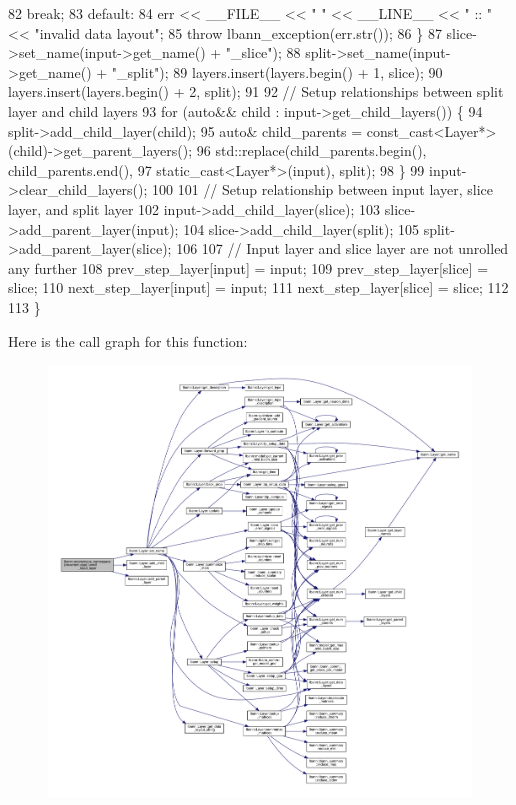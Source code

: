 \begin{DoxyCode}
82     \textcolor{keywordflow}{break};
83   \textcolor{keywordflow}{default}:
84     err << \_\_FILE\_\_ << \textcolor{stringliteral}{" "} << \_\_LINE\_\_ << \textcolor{stringliteral}{" :: "} << \textcolor{stringliteral}{"invalid data layout"};
85     \textcolor{keywordflow}{throw} lbann\_exception(err.str());
86   \}
87   slice->set\_name(input->get\_name() + \textcolor{stringliteral}{"\_slice"});
88   split->set\_name(input->get\_name() + \textcolor{stringliteral}{"\_split"});
89   layers.insert(layers.begin() + 1, slice);
90   layers.insert(layers.begin() + 2, split);
91 
92   \textcolor{comment}{// Setup relationships between split layer and child layers}
93   \textcolor{keywordflow}{for} (\textcolor{keyword}{auto}&& child : input->get\_child\_layers()) \{
94     split->add\_child\_layer(child);
95     \textcolor{keyword}{auto}& child\_parents = \textcolor{keyword}{const\_cast<}Layer*\textcolor{keyword}{>}(child)->get\_parent\_layers();
96     std::replace(child\_parents.begin(), child\_parents.end(),
97                  \textcolor{keyword}{static\_cast<}Layer*\textcolor{keyword}{>}(input), split);
98   \}
99   input->clear\_child\_layers();
100 
101   \textcolor{comment}{// Setup relationship between input layer, slice layer, and split layer}
102   input->add\_child\_layer(slice);
103   slice->add\_parent\_layer(input);
104   slice->add\_child\_layer(split);
105   split->add\_parent\_layer(slice);
106 
107   \textcolor{comment}{// Input layer and slice layer are not unrolled any further}
108   prev\_step\_layer[input] = input;
109   prev\_step\_layer[slice] = slice;
110   next\_step\_layer[input] = input;
111   next\_step\_layer[slice] = slice;
112 
113 \}
\end{DoxyCode}
Here is the call graph for this function\+:\nopagebreak
\begin{figure}[H]
\begin{center}
\leavevmode
\includegraphics[width=350pt]{namespacelbann_1_1anonymous__namespace_02recurrent_8cpp_03_a8c76387c2dd531058700ad9a41cd093a_cgraph}
\end{center}
\end{figure}
